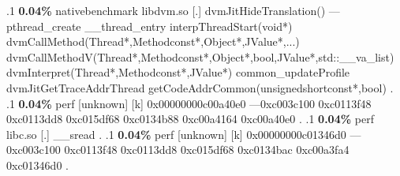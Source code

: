 \begin{profile}
{.1 \textbf{ 0.04\%} nativebenchmark  libdvm.so              [.] dvmJitHideTranslation()\newline {} ---pthread\_create\newline {} \_\_thread\_entry\newline {} interpThreadStart(void*)\newline {} dvmCallMethod(Thread*,Methodconst*,Object*,JValue*,...)\newline {} dvmCallMethodV(Thread*,Methodconst*,Object*,bool,JValue*,std::\_\_va\_list)\newline {} dvmInterpret(Thread*,Methodconst*,JValue*)\newline {} common\_updateProfile\newline {} dvmJitGetTraceAddrThread\newline {} getCodeAddrCommon(unsignedshortconst*,bool)\newline {} . 
.1 \textbf{ 0.04\%} perf             [unknown]              [k] 0x00000000c00a40e0\newline {} ---0xc003c100\newline {} 0xc0113f48\newline {} 0xc0113dd8\newline {} 0xc015df68\newline {} 0xc0134b88\newline {} 0xc00a4164\newline {} 0xc00a40e0\newline {} . 
.1 \textbf{ 0.04\%} perf             libc.so                [.] \_\_sread\newline {} . 
.1 \textbf{ 0.04\%} perf             [unknown]              [k] 0x00000000c01346d0\newline {} ---0xc003c100\newline {} 0xc0113f48\newline {} 0xc0113dd8\newline {} 0xc015df68\newline {} 0xc0134bac\newline {} 0xc00a3fa4\newline {} 0xc01346d0\newline {} . 
}
\end{profile}
